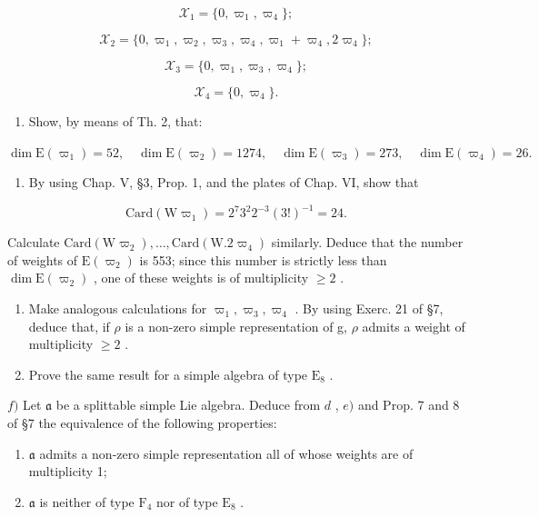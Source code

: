 \[
\mathcal {X} _ {1} = \{0, \varpi_ {1}, \varpi_ {4} \};
\]

\[
\mathcal {X} _ {2} = \{0, \varpi_ {1}, \varpi_ {2}, \varpi_ {3}, \varpi_ {4}, \varpi_ {1} + \varpi_ {4}, 2 \varpi_ {4} \};
\]

\[
\mathcal {X} _ {3} = \{0, \varpi_ {1}, \varpi_ {3}, \varpi_ {4} \};
\]

\[
\mathcal {X} _ {4} = \{0, \varpi_ {4} \}.
\]

\begin{enumerate}
\def\labelenumi{\alph{enumi})}
\setcounter{enumi}{1}
\tightlist
\item
  Show, by means of Th. 2, that:
\end{enumerate}

\(\dim \mathrm{E}(\varpi_1) = 52,\quad \dim \mathrm{E}(\varpi_2) = 1274,\quad \dim \mathrm{E}(\varpi_3) = 273,\quad \dim \mathrm{E}(\varpi_4) = 26.\)

\begin{enumerate}
\def\labelenumi{\alph{enumi})}
\setcounter{enumi}{2}
\tightlist
\item
  By using Chap. V, §3, Prop. 1, and the plates of Chap. VI, show that
\end{enumerate}

\[
\mathrm{Card} (\mathrm{W} \varpi_ {1}) = 2 ^ {7} 3 ^ {2} 2 ^ {- 3} (3!) ^ {- 1} = 24.
\]

Calculate \(\mathrm{Card}(\mathrm{W}\varpi_{2}),\ldots,\mathrm{Card}(\mathrm{W}.2\varpi_{4})\) similarly. Deduce that the number of weights of \(\mathrm{E}(\varpi_{2})\) is 553; since this number is strictly less than \(\dim\mathrm{E}(\varpi_{2})\) , one of these weights is of multiplicity \(\geq2\) .

\begin{enumerate}
\def\labelenumi{\alph{enumi})}
\setcounter{enumi}{3}
\item
  Make analogous calculations for \(\varpi_{1},\varpi_{3},\varpi_{4}\) . By using Exerc. 21 of §7, deduce that, if \(\rho\) is a non-zero simple representation of g, \(\rho\) admits a weight of multiplicity \(\geq2\) .
\item
  Prove the same result for a simple algebra of type \(\mathrm{E}_8\) .
\end{enumerate}

\(f)\) Let \(\mathfrak{a}\) be a splittable simple Lie algebra. Deduce from \(d\) , \(e)\) and Prop. 7 and 8 of §7 the equivalence of the following properties:

\begin{enumerate}
\def\labelenumi{(\roman{enumi})}
\item
  \(\mathfrak{a}\) admits a non-zero simple representation all of whose weights are of multiplicity 1;
\item
  \(\mathfrak{a}\) is neither of type \(\mathrm{F}_4\) nor of type \(\mathrm{E}_8\) .
\end{enumerate}

